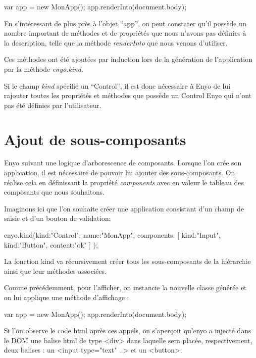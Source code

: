 \documentclass[11pt,a4paper]{report}
\begin{document}
\begin{JavaScript}
  var app = new MonApp();
  app.renderInto(document.body);
\end{JavaScript}

En s'intéressant de plus près à l'objet ``app'', on peut constater qu'il
possède un nombre important de méthodes et de propriétés que nous n'avons 
pas définies à la description, telle que la méthode \emph{renderInto}
que nous venons d'utiliser.

Ces méthodes ont été ajoutées par induction lors de la génération de 
l'application par la méthode \emph{enyo.kind}.

Si le champ \emph{kind} spécifie un ``Control'', il est donc nécessaire à Enyo de
lui rajouter toutes les propriétés et méthodes que possède un Control Enyo qui
n'ont pas été définies par l'utilisateur.

\section{Ajout de sous-composants}
Enyo suivant une logique d'arborescence de composants. Lorsque l'on crée 
son application, il est nécessaire de pouvoir lui ajouter des sous-composants. 
On réalise cela en définissant la propriété \emph{components} avec en valeur le tableau 
des composants que nous souhaitons.

Imaginons ici que l'on souhaite créer une application consistant d'un champ de saisie 
et d'un bouton de validation:
\begin{JavaScript}
 enyo.kind({kind:"Control",
            name:"MonApp",
            components: [
                         {kind:"Input"},
                         {kind:"Button", content:"ok"}
                        ]
           });
\end{JavaScript}

La fonction kind va récursivement créer tous les sous-composants de la hiérarchie 
ainsi que leur méthodes associées.

Comme précédemment, pour l'afficher, on instancie la nouvelle classe générée 
et on lui applique une méthode d'affichage : 

\begin{JavaScript}
  var app = new MonApp();
  app.renderInto(document.body);
\end{JavaScript}

Si l'on observe le code html après ces appels, on s'aperçoit qu'enyo a injecté dans 
le DOM une balise html de type <div> dans laquelle sera placée, respectivement, 
deux balises : un <input type="text" ..> et un <button>.
\end{document}
